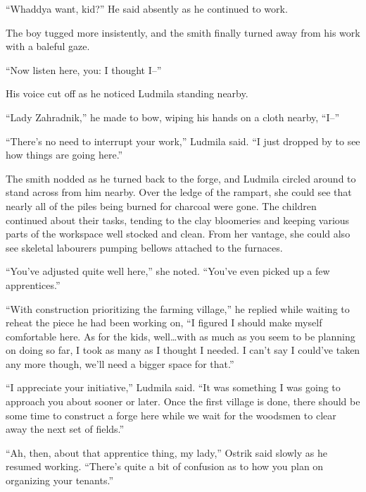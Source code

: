  

“Whaddya want, kid?” He said absently as he continued to work.

 

The boy tugged more insistently, and the smith finally turned away from his work with a baleful gaze.

 

“Now listen here, you: I thought I–”

 

His voice cut off as he noticed Ludmila standing nearby.

 

“Lady Zahradnik,” he made to bow, wiping his hands on a cloth nearby, “I–”

 

“There’s no need to interrupt your work,” Ludmila said. “I just dropped by to see how things are going here.”

 

The smith nodded as he turned back to the forge, and Ludmila circled around to stand across from him nearby. Over the ledge of the rampart, she could see that nearly all of the piles being burned for charcoal were gone. The children continued about their tasks, tending to the clay bloomeries and keeping various parts of the workspace well stocked and clean. From her vantage, she could also see skeletal labourers pumping bellows attached to the furnaces.

 

“You’ve adjusted quite well here,” she noted. “You’ve even picked up a few apprentices.”

 

“With construction prioritizing the farming village,” he replied while waiting to reheat the piece he had been working on, “I figured I should make myself comfortable here. As for the kids, well…with as much as you seem to be planning on doing so far, I took as many as I thought I needed. I can’t say I could’ve taken any more though, we’ll need a bigger space for that.”

 

“I appreciate your initiative,” Ludmila said. “It was something I was going to approach you about sooner or later. Once the first village is done, there should be some time to construct a forge here while we wait for the woodsmen to clear away the next set of fields.”

 

“Ah, then, about that apprentice thing, my lady,” Ostrik said slowly as he resumed working. “There’s quite a bit of confusion as to how you plan on organizing your tenants.”


